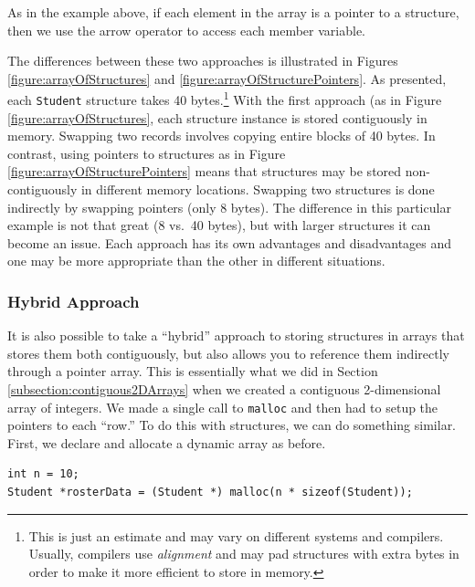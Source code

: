 As in the example above, if each element in the array is a pointer
to a structure, then we use the arrow operator to access each 
member variable.

The differences between these two approaches is illustrated in
Figures \ref{figure:arrayOfStructures} and \ref{figure:arrayOfStructurePointers}.
As presented, each \texttt{Student} structure takes 40 
bytes.\footnote{This is just an estimate and may vary on different systems
and compilers.  Usually, compilers use \emph{alignment} and may pad
structures with extra bytes in order to make it more efficient to store
in memory.}  With the first approach (as in Figure 
\ref{figure:arrayOfStructures}, each structure instance is stored 
contiguously in memory.  Swapping two records involves copying entire
blocks of 40 bytes.  In contrast, using pointers to structures as in
Figure \ref{figure:arrayOfStructurePointers} means that structures may
be stored non-contiguously in different memory locations.  Swapping
two structures is done indirectly by swapping pointers (only 8 bytes).
The difference in this particular example is not that great (8 vs.\ 40 bytes), 
but with larger structures it can become an issue.  Each approach has
its own advantages and disadvantages and one may be more appropriate 
than the other in different situations.





\subsubsection{Hybrid Approach}

It is also possible to take a ``hybrid'' approach to storing structures
in arrays that stores them both contiguously, but also allows you to reference
them indirectly through a pointer array.  This is essentially what we did
in Section \ref{subsection:contiguous2DArrays} when we created a contiguous
2-dimensional array of integers.  We made a single call to \texttt{malloc}
and then had to setup the pointers to each ``row.''  To do this with 
structures, we can do something similar.  First, we declare and allocate 
a dynamic array as before.

\begin{verbatim}
int n = 10;
Student *rosterData = (Student *) malloc(n * sizeof(Student));
\end{verbatim}

